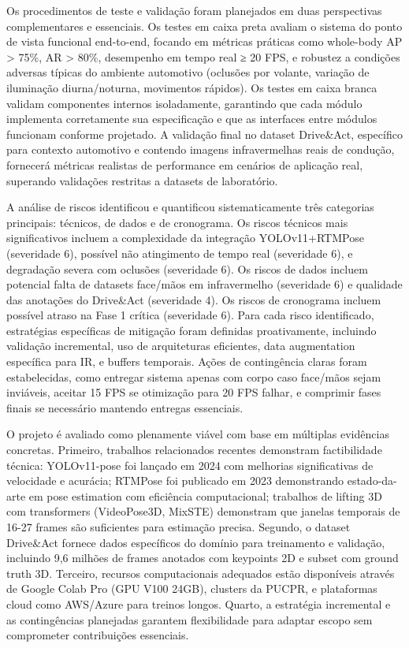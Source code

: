 \documentclass[12pt, a4paper]{article}
\begin{document}
Os procedimentos de teste e validação foram planejados em duas perspectivas complementares e essenciais. Os testes em caixa preta avaliam o sistema do ponto de vista funcional end-to-end, focando em métricas práticas como whole-body AP > 75\%, AR > 80\%, desempenho em tempo real ≥ 20 FPS, e robustez a condições adversas típicas do ambiente automotivo (oclusões por volante, variação de iluminação diurna/noturna, movimentos rápidos). Os testes em caixa branca validam componentes internos isoladamente, garantindo que cada módulo implementa corretamente sua especificação e que as interfaces entre módulos funcionam conforme projetado. A validação final no dataset Drive\&Act, específico para contexto automotivo e contendo imagens infravermelhas reais de condução, fornecerá métricas realistas de performance em cenários de aplicação real, superando validações restritas a datasets de laboratório.

A análise de riscos identificou e quantificou sistematicamente três categorias principais: técnicos, de dados e de cronograma. Os riscos técnicos mais significativos incluem a complexidade da integração YOLOv11+RTMPose (severidade 6), possível não atingimento de tempo real (severidade 6), e degradação severa com oclusões (severidade 6). Os riscos de dados incluem potencial falta de datasets face/mãos em infravermelho (severidade 6) e qualidade das anotações do Drive\&Act (severidade 4). Os riscos de cronograma incluem possível atraso na Fase 1 crítica (severidade 6). Para cada risco identificado, estratégias específicas de mitigação foram definidas proativamente, incluindo validação incremental, uso de arquiteturas eficientes, data augmentation específica para IR, e buffers temporais. Ações de contingência claras foram estabelecidas, como entregar sistema apenas com corpo caso face/mãos sejam inviáveis, aceitar 15 FPS se otimização para 20 FPS falhar, e comprimir fases finais se necessário mantendo entregas essenciais.

O projeto é avaliado como plenamente viável com base em múltiplas evidências concretas. Primeiro, trabalhos relacionados recentes demonstram factibilidade técnica: YOLOv11-pose foi lançado em 2024 com melhorias significativas de velocidade e acurácia; RTMPose foi publicado em 2023 demonstrando estado-da-arte em pose estimation com eficiência computacional; trabalhos de lifting 3D com transformers (VideoPose3D, MixSTE) demonstram que janelas temporais de 16-27 frames são suficientes para estimação precisa. Segundo, o dataset Drive\&Act fornece dados específicos do domínio para treinamento e validação, incluindo 9,6 milhões de frames anotados com keypoints 2D e subset com ground truth 3D. Terceiro, recursos computacionais adequados estão disponíveis através de Google Colab Pro (GPU V100 24GB), clusters da PUCPR, e plataformas cloud como AWS/Azure para treinos longos. Quarto, a estratégia incremental e as contingências planejadas garantem flexibilidade para adaptar escopo sem comprometer contribuições essenciais.
\end{document}
